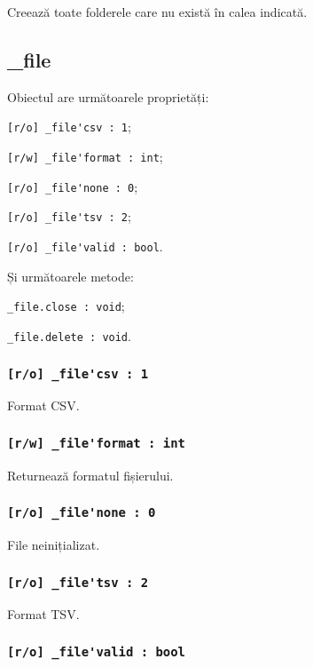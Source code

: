 Creează toate folderele care nu există în calea indicată.

\subsection{{\color{orange} \_file}}

Obiectul \file{} are următoarele proprietăți:
\begin{icItems}
	\item \lstinline|[r/o] _file'csv : 1|;
	\item \lstinline|[r/w] _file'format : int|;
	\item \lstinline|[r/o] _file'none : 0|;
	\item \lstinline|[r/o] _file'tsv : 2|;
	\item \lstinline|[r/o] _file'valid : bool|.
\end{icItems}

Și următoarele metode:
\begin{icItems}
	\item \lstinline|_file.close : void|;
	\item \lstinline|_file.delete : void|.
\end{icItems}

\subsubsection{\lstinline|[r/o] _file'csv : 1|}

Format CSV.

\subsubsection{\lstinline|[r/w] _file'format : int|}

Returnează formatul fișierului.

\subsubsection{\lstinline|[r/o] _file'none : 0|}

File neinițializat.

\subsubsection{\lstinline|[r/o] _file'tsv : 2|}

Format TSV.

\subsubsection{\lstinline|[r/o] _file'valid : bool|}

